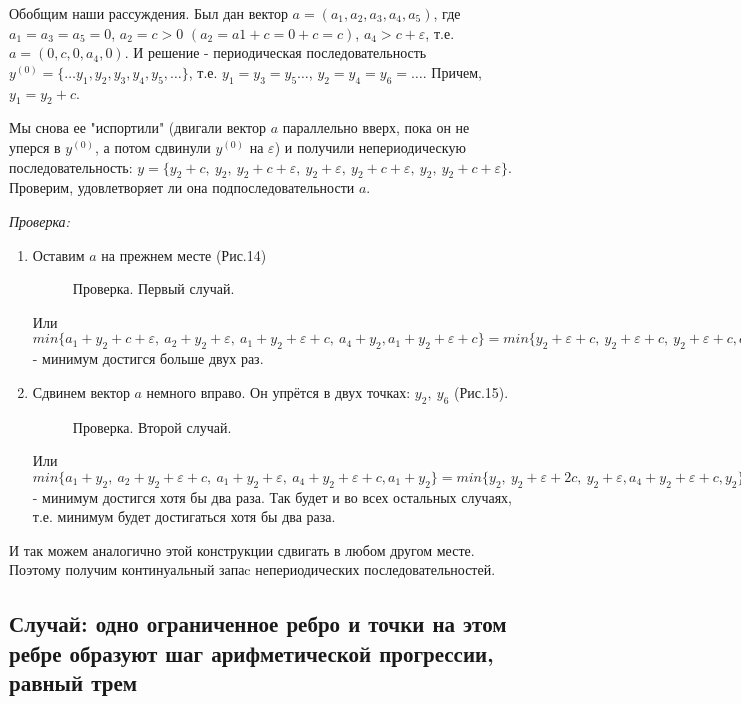 \documentclass[russian]{lecture-notes}
\begin{document}
Обобщим наши рассуждения.
Был дан вектор $a=(a_1,a_2,a_3,a_4,a_5)$, где $a_1=a_3=a_5=0$, $a_2=c>0$  $(a_2=a1+c=0+c=c)$,  $a_4>c+\varepsilon$, т.е. $a=(0,c,0,a_4,0)$. И решение - периодическая последовательность $y^{(0)}=\{\ldots y_1,y_2,y_3,y_4,y_5,\ldots\}$, т.е. $y_1=y_3=y_5\ldots$, $y_2=y_4=y_6=\ldots$. Причем, $y_1=y_2+c$.

Мы снова ее "испортили" (двигали вектор $a$ параллельно вверх, пока он не уперся в $y^{(0)}$, а потом сдвинули $y^{(0)}$ на $\varepsilon$) и получили непериодическую последовательность: $y=\{y_2+c,\ y_2,\ y_2+c+\varepsilon,\ y_2+\varepsilon,\ y_2+c+\varepsilon,\ y_2,\ y_2+c+\varepsilon\}$. Проверим, удовлетворяет ли она подпоследовательности $a$.

\emph{Проверка:}
\begin{enumerate}
\item
Оставим $a$ на прежнем месте (Рис.14)

\begin{figure}[h!]
\caption{Проверка. Первый случай.}
\end{figure}

Или $min\{a_1+y_2+c+\varepsilon,\ a_2+y_2+\varepsilon,\ a_1+y_2+\varepsilon+c,\ a_4+y_2, a_1+y_2+\varepsilon+c\}=min\{y_2+\varepsilon+c,\ y_2+\varepsilon+c,\ y_2+\varepsilon+c, a_4+y_2, y_2+\varepsilon+c\}=y_2+\varepsilon+c$ - минимум достигся больше двух раз.
\item
Сдвинем вектор $a$ немного вправо. Он упрётся в двух точках: $y_2,\ y_6$  (Рис.15).
\begin{figure}[h!]
\caption{Проверка. Второй случай.}
\end{figure}
Или $min\{a_1+y_2,\ a_2+y_2+\varepsilon+c,\ a_1+y_2+\varepsilon,\ a_4+y_2+\varepsilon+c, a_1+y_2\}=min\{y_2,\ y_2+\varepsilon+2c,\ y_2+\varepsilon, a_4+y_2+\varepsilon+c, y_2\}=y_2$ - минимум достигся хотя бы два раза. Так будет и во всех остальных случаях, т.е. минимум будет достигаться хотя бы два раза.
\end{enumerate}



И так можем аналогично этой конструкции сдвигать в любом другом месте. Поэтому получим континуальный запаc непериодических последовательностей.
\subsection{Случай: одно ограниченное ребро и точки на этом ребре образуют шаг арифметической прогрессии, равный трем}
\end{document}
